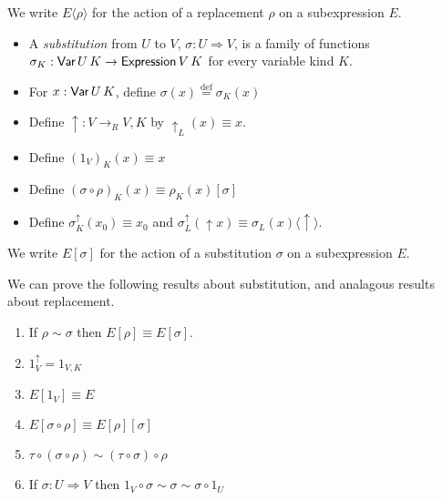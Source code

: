 \documentclass[envcountsame]{llncs}
\newcommand{\eqdef}{\ensuremath{\stackrel{\mathrm{def}}{=}}}
\begin{document}
We write $E \langle \rho \rangle$ for the action of a replacement $\rho$ on a subexpression $E$.

\begin{definition}[Substitution]
 \begin{itemize}
  \item A \emph{substitution} from $U$ to $V$, $\sigma : U \Rightarrow V$, is a family of functions $\sigma_K : \AgdaDatatype{Var} \, U \, K \rightarrow
  \AgdaDatatype{Expression} \, V \, K$ for every variable kind $K$.
  \item For $x : \AgdaDatatype{Var} \, U \, K$, define $\sigma(x) \eqdef \sigma_K(x)$
  \item Define $\uparrow : V \rightarrow_R V , K$ by $\uparrow_L(x) \equiv x$.
  \item Define $(1_V)_K(x) \equiv x$
  \item Define $(\sigma \circ \rho)_K(x) \equiv \rho_K(x) [ \sigma ]$
  \item Define $\sigma^\uparrow_K(x_0) \equiv x_0$ and $\sigma^\uparrow_L(\uparrow x) \equiv \sigma_L(x) \langle \uparrow \rangle$.
 \end{itemize}
\end{definition}

We write $E [ \sigma ]$ for the action of a substitution $\sigma$ on a subexpression $E$.


We can prove the following results about substitution, and analagous results about replacement.
\begin{lemma}
 \begin{enumerate}
  \item If $\rho \sim \sigma$ then $E [ \rho ] \equiv E [ \sigma ]$.
  \item  $1_V^\uparrow = 1_{V, K}$
  \item $E [ 1_V ] \equiv E$
  \item $E [ \sigma \circ \rho ] \equiv E [ \rho ] [ \sigma ]$
  \item $\tau \circ (\sigma \circ \rho) \sim (\tau \circ \sigma) \circ \rho$
  \item If $\sigma : U \Rightarrow V$ then $1_V \circ \sigma \sim \sigma \sim \sigma \circ 1_U$
 \end{enumerate}
\end{lemma}
\end{document}
